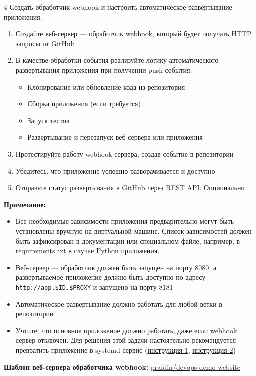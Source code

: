 \documentclass[12pt,a4paper]{article}
\begin{document}
\begin{task}{4}
    Создать обработчик webhook и настроить автоматическое развертывание приложения.
    
    \begin{enumerate}
        \item Создайте веб-сервер — обработчик webhook, который будет получать HTTP запросы от GitHub
        \item В качестве обработки события реализуйте логику автоматического развертывания приложения при получении push события:
        \begin{itemize}
            \item Клонирование или обновление кода из репозитория
            \item Сборка приложения (если требуется)
            \item Запуск тестов
            \item Развертывание и перезапуск веб-сервера или приложения
        \end{itemize}
        \item Протестируйте работу webhook сервера, создав событие в репозитории
        \item Убедитесь, что приложение успешно разворачивается и доступно
        \item Отправьте статус развертывания в GitHub через \href{https://docs.github.com/en/rest/commits/statuses?apiVersion=2022-11-28#create-a-commit-status}{REST API}. Опционально
    \end{enumerate}

    \textbf{Примечание:}
    \begin{itemize}
        \item Все необходимые зависимости приложения предварительно могут быть установлены вручную на виртуальной машине.
        Список зависимостей должен быть зафиксирован в документации или специальном файле, например, в requirements.txt в случае Python приложения.
        \item Веб-сервер — обработчик должен быть запущен на порту 8080, а развертываемое приложение должно быть доступно по адресу \texttt{http://app.\$ID.\$PROXY} и запущено на порту 8181
        \item Автоматическое развертывание должно работать для любой ветки в репозитории
        \item Учтите, что основное приложение должно работать, даже если webhook сервер отключен.
        Для решения этой задачи настоятельно рекомендуется превратить приложение в systemd сервис (\href{https://webdock.io/en/docs/how-guides/app-installation-and-setup/how-daemonize-application-systemd}{инструкция 1}, \href{https://medium.com/@benmorel/creating-a-linux-service-with-systemd-611b5c8b91d6}{инструкция 2})
    \end{itemize}

    \textbf{Шаблон веб-сервера обработчика webhook:}
    \href{https://github.com/prafdin/devops-demo-website/blob/webhook-demo/webhook-server.py}{prafdin/devops-demo-website}
\end{task}
\end{document}
